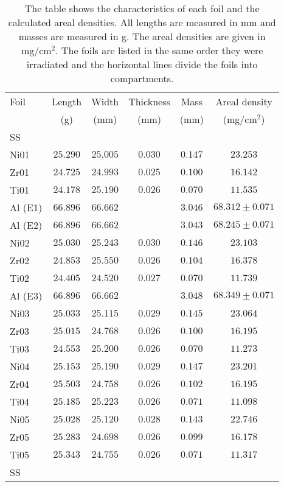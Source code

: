 \begin{table}[h!]%
    \centering
    \label{Tab:foilcharacterization}
       \caption[Foil characterization]{The table shows the characteristics of each foil and the calculated areal densities. All lengths are measured in mm and masses are measured in g. The areal densities are given in mg/cm$^2$. The foils are listed in the same order they were irradiated and the horizontal lines divide the foils into compartments.}
    \begin{tabular}{lccccc}
        \toprule
        \textsf{Foil} & \textsf{Length} & \textsf{Width} & \textsf{Thickness} & \textsf{Mass} &  \textsf{Areal density}      \\
         & \textsf{(g)} & \textsf{(mm)} & \textsf{(mm)} & \textsf{(mm)}  & \textsf{(mg/cm$^2$)}      \\
        \midrule
        SS  & & & & &  \\
        \midrule
        Ni01  & $25.290$ & $25.005$ & $0.030$ & $0.147$ & $23.253$  \\
        Zr01  & $24.725$ & $24.993$ & $0.025$ & $0.100$ & $16.142$  \\
        Ti01  & $24.178$ & $25.190$ & $0.026$ & $0.070$ & $11.535$  \\
        Al (E1)  & $66.896$ & $66.662$ & & $3.046$ &  $68.312\pm0.071$\\
        Al (E2)  & $66.896$ & $66.662$ & & $3.043$  & $68.245\pm0.071$  \\
        \midrule
        Ni02  & $25.030$ & $25.243$ & $0.030$ & $0.146$ & $23.103$  \\
        Zr02  & $24.853$ & $25.550$ & $0.026$ & $0.104$ & $16.378$  \\
        Ti02  & $24.405$ & $24.520$ & $0.027$ & $0.070$ & $11.739$  \\
        Al (E3)  & $66.896$ & $66.662$ & & $3.048$ & $68.349\pm0.071$  \\
        \midrule
        Ni03  & $25.033$ & $25.115$ & $0.029$ & $0.145$ & $23.064$ \\
        Zr03  & $25.015$ & $24.768$ & $0.026$ & $0.100$ & $16.195$  \\
        Ti03  & $24.553$ & $25.200$ & $0.026$ & $0.070$ & $11.273$  \\
        \midrule
        Ni04  & $25.153$ & $25.190$ & $0.029$ & $0.147$ & $23.201$  \\
        Zr04  & $25.503$ & $24.758$ & $0.026$ & $0.102$ & $16.195$  \\
        Ti04  & $25.185$ & $25.223$ & $0.026$ & $0.071$ & $11.098$  \\
        \midrule
        Ni05  & $25.028$ & $25.120$ & $0.028$ & $0.143$ & $22.746$  \\
        Zr05  & $25.283$ & $24.698$ & $0.026$ & $0.099$ & $16.178$  \\
        Ti05  & $25.343$ & $24.755$ & $0.026$ & $0.071$ & $11.317$  \\
        \midrule
        SS & & & & & \\
        \bottomrule
    \end{tabular}
\end{table}
